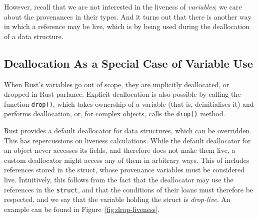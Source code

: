 \documentclass[11pt,a4paper,twoside,openany,draft]{report}
\newcommand{\InRust}[1]{\texttt{#1}}
\begin{document}
However, recall that we are not interested in the liveness of \emph{variables};
we care about the provenances in their types. And it turns out that there is
another way in which a reference may be live, which is by being used during the
deallocation of a data structure.

\subsection{Deallocation As a Special Case of Variable Use}\label{sec:deall-as-spec}
When Rust's variables go out of scope, they are implicitly deallocated, or
dropped in Rust parlance. Explicit deallocation is also possible by calling the
function \InRust{drop()}, which takes ownership of a variable (that is,
deinitialises it) and performs deallocation, or, for complex objects, calls the
\InRust{drop()} method.

Rust provides a default deallocator for data structures, which can be
overridden. This has repercussions on liveness calculations. While the default
deallocator for an object never accesses its fields, and therefore does not make
them live, a custom deallocator might access any of them in arbitrary ways. This
of includes references stored in the struct, whose provenance variables must be
considered live. Intuitively, this follows from the fact that the deallocator
may use the references in the \InRust{struct}, and that the conditions of their
loans must therefore be respected, and we say that the variable holding the
struct is \textit{drop-live}. An example can be found in
Figure~\ref{fig:drop-liveness}.
\end{document}
